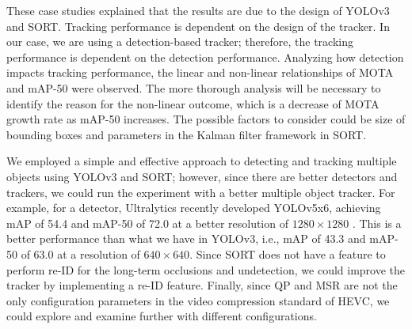 These case studies explained that the results are due to the design of YOLOv3 and SORT. Tracking performance is dependent on the design of the tracker. In our case, we are using a detection-based tracker; therefore, the tracking performance is dependent on the detection performance. Analyzing how detection impacts tracking performance, the linear and non-linear relationships of MOTA and mAP-50 were observed. The more thorough analysis will be necessary to identify the reason for the non-linear outcome, which is a decrease of MOTA growth rate as mAP-50 increases. The possible factors to consider could be size of bounding boxes and parameters in the Kalman filter framework in SORT.

We employed a simple and effective approach to detecting and tracking multiple objects using YOLOv3 and SORT; however, since there are better detectors and trackers, we could run the experiment with a better multiple object tracker. For example, for a detector, Ultralytics recently developed YOLOv5x6, achieving mAP of 54.4 and mAP-50 of 72.0 at a better resolution of $1280 \times 1280$ \cite{jocher_ultralyticsyolov5_2021}. This is a better performance than what we have in YOLOv3, i.e., mAP of 43.3 and mAP-50 of 63.0 at a resolution of $640 \times 640$. Since SORT does not have a feature to perform re-ID for the long-term occlusions and undetection, we could improve the tracker by implementing a re-ID feature. Finally, since QP and MSR are not the only configuration parameters in the video compression standard of HEVC, we could explore and examine further with different configurations.